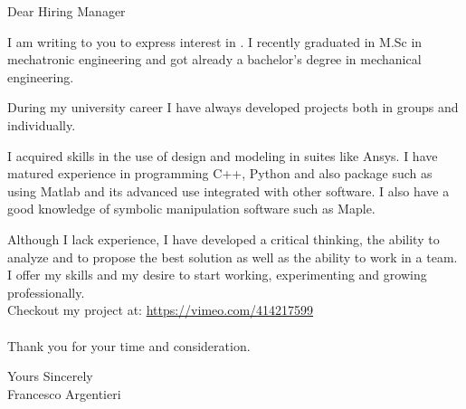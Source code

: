 \documentclass[a4paper,english]{friggeri-letter}
\begin{document}
\address{
   Circonvallazione Istoniense, 20 \\
   Vasto (CH), 66054 \\
   Italy
}



\opening{Dear Hiring Manager}

I am writing to you to express interest in .
I recently graduated in M.Sc in mechatronic engineering and got already a bachelor's degree in mechanical engineering.

During my university career I have always developed projects both in groups and individually.

I acquired skills in the use of design and modeling in suites like Ansys. I have matured experience in programming C++, Python and also package such as using Matlab and its advanced use integrated with other software.
I also have a good knowledge of symbolic manipulation software such as Maple. 

Although I lack experience, I have developed a critical thinking, the ability to analyze and to propose the best solution as well as the ability to work in a team. 
I offer my skills and my desire to start working, experimenting and growing professionally.\\
Checkout my project at: \href{https://vimeo.com/414217599}{https://vimeo.com/414217599}\\\linebreak
\\Thank you for your time and consideration.

\closing{
   Yours Sincerely\\
   Francesco Argentieri}
\end{document}

